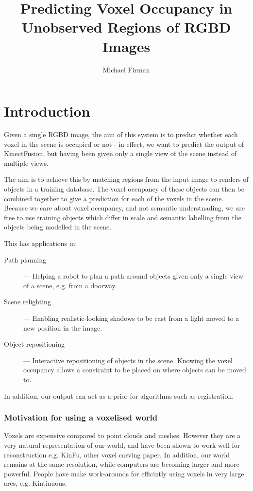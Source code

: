 \documentclass[10pt,a4paper]{article}
\title{Predicting Voxel Occupancy in Unobserved Regions of RGBD Images}
\author{Michael Firman}
\makeatletter
\newcommand*{\eg}{e.g.\@\xspace}
\makeatother
\begin{document}
\maketitle

\section{Introduction}

Given a single RGBD image, the aim of this system is to predict whether each voxel in the scene is occupied or not - in effect, we want to predict the output of KinectFusion, but having been given only a single view of the scene instead of multiple views.

The aim is to achieve this by matching regions from the input image to renders of objects in a training database. The voxel occupancy of these objects can then be combined together to give a prediction for each of the voxels in the scene. Because we care about voxel occupancy, and not semantic understnading, we are free to use training objects which differ in scale and semantic labelling from the objects being modelled in the scene.


This has applications in:

\begin{description}

\item[Path planning] --- Helping a robot to plan a path around objects given only a single view of a scene, e.g. from a doorway.

\item[Scene relighting] --- Enabling realistic-looking shadows to be cast from a light moved to a new position in the image.

\item[Object repositioning] --- Interactive repositioning of objects in the scene. Knowing the voxel occupancy allows a constraint to be placed on where objects can be moved to.

\end{description}

In addition, our output can act as a prior for algorithms such as registration.

\subsubsection{Motivation for using a voxelised world}

Voxels are expensive compared to point clouds and meshes. 
However they are a very natural representation of our world, and have been shown to work well for reconstruction \eg KinFu, other voxel carving paper. 
In addition, our world remains at the same resolution, while computers are becoming larger and more powerful. 
People have make work-arounds for efficintly using voxels in very large ares, \eg Kintinuous.
\end{document}
